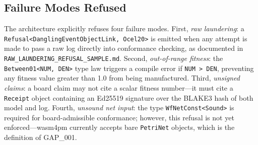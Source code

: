 \subsection{Failure Modes Refused}
\label{sec:experiments-core-arch-failures}

The architecture explicitly refuses four failure modes. First, \emph{raw laundering}:
a \texttt{Refusal<DanglingEventObjectLink, Ocel20>} is emitted when any attempt is
made to pass a raw log directly into conformance checking, as documented in
\texttt{RAW\_LAUNDERING\_REFUSAL\_SAMPLE.md}. Second, \emph{out-of-range fitness}:
the \texttt{Between01<NUM, DEN>} type law triggers a compile error if
\texttt{NUM > DEN}, preventing any fitness value greater than 1.0 from being
manufactured. Third, \emph{unsigned claims}: a board claim may not cite a scalar
fitness number---it must cite a \texttt{Receipt} object containing an Ed25519 signature
over the BLAKE3 hash of both model and log. Fourth, \emph{unsound net input}:
the type \texttt{WfNetConst<Sound>} is required for board-admissible conformance;
however, this refusal is not yet enforced---wasm4pm currently accepts bare
\texttt{PetriNet} objects, which is the definition of GAP\_001.
